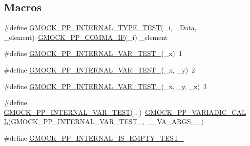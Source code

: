 \subsection*{Macros}
\begin{DoxyCompactItemize}
\item 
\#define \mbox{\hyperlink{googletest-master_2googlemock_2test_2gmock-pp__test_8cc_add9a565fd01a36e8fc77005ff7ddee44}{G\+M\+O\+C\+K\+\_\+\+P\+P\+\_\+\+I\+N\+T\+E\+R\+N\+A\+L\+\_\+\+T\+Y\+P\+E\+\_\+\+T\+E\+ST}}(\+\_\+i,  \+\_\+\+Data,  \+\_\+element)~\mbox{\hyperlink{_obj__test_2lib_2googletest-master_2googlemock_2include_2gmock_2internal_2gmock-pp_8h_acad3f789b483c40204f25a56c3342103}{G\+M\+O\+C\+K\+\_\+\+P\+P\+\_\+\+C\+O\+M\+M\+A\+\_\+\+IF}}(\+\_\+i) \+\_\+element
\item 
\#define \mbox{\hyperlink{googletest-master_2googlemock_2test_2gmock-pp__test_8cc_af50bdb0dbcdac1eede87e5b261aef933}{G\+M\+O\+C\+K\+\_\+\+P\+P\+\_\+\+I\+N\+T\+E\+R\+N\+A\+L\+\_\+\+V\+A\+R\+\_\+\+T\+E\+S\+T\+\_}}(\+\_\+x)~1
\item 
\#define \mbox{\hyperlink{googletest-master_2googlemock_2test_2gmock-pp__test_8cc_afad491ad91c52f7f8bad4ccd3448ce5b}{G\+M\+O\+C\+K\+\_\+\+P\+P\+\_\+\+I\+N\+T\+E\+R\+N\+A\+L\+\_\+\+V\+A\+R\+\_\+\+T\+E\+S\+T\+\_}}(\+\_\+x,  \+\_\+y)~2
\item 
\#define \mbox{\hyperlink{googletest-master_2googlemock_2test_2gmock-pp__test_8cc_aea89cca718bf036fc3f1b10ab67019fb}{G\+M\+O\+C\+K\+\_\+\+P\+P\+\_\+\+I\+N\+T\+E\+R\+N\+A\+L\+\_\+\+V\+A\+R\+\_\+\+T\+E\+S\+T\+\_}}(\+\_\+x,  \+\_\+y,  \+\_\+z)~3
\item 
\#define \mbox{\hyperlink{googletest-master_2googlemock_2test_2gmock-pp__test_8cc_af286893c080171240ce005160f017f65}{G\+M\+O\+C\+K\+\_\+\+P\+P\+\_\+\+I\+N\+T\+E\+R\+N\+A\+L\+\_\+\+V\+A\+R\+\_\+\+T\+E\+ST}}(...)~\mbox{\hyperlink{_obj__test_2lib_2googletest-master_2googlemock_2include_2gmock_2internal_2gmock-pp_8h_a4dd8715f753c7c3957f7185acf609e55}{G\+M\+O\+C\+K\+\_\+\+P\+P\+\_\+\+V\+A\+R\+I\+A\+D\+I\+C\+\_\+\+C\+A\+LL}}(G\+M\+O\+C\+K\+\_\+\+P\+P\+\_\+\+I\+N\+T\+E\+R\+N\+A\+L\+\_\+\+V\+A\+R\+\_\+\+T\+E\+S\+T\+\_\+, \+\_\+\+\_\+\+V\+A\+\_\+\+A\+R\+G\+S\+\_\+\+\_\+)
\item 
\#define \mbox{\hyperlink{googletest-master_2googlemock_2test_2gmock-pp__test_8cc_ab8635d85cb91992914a106bb5c229829}{G\+M\+O\+C\+K\+\_\+\+P\+P\+\_\+\+I\+N\+T\+E\+R\+N\+A\+L\+\_\+\+I\+S\+\_\+\+E\+M\+P\+T\+Y\+\_\+\+T\+E\+S\+T\+\_}}
\end{DoxyCompactItemize}


